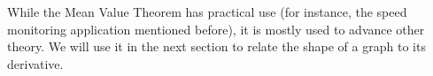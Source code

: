 While the Mean Value Theorem has practical use (for instance, the speed monitoring application mentioned before), it is mostly used to advance other theory. We will use it in the next section to relate  the shape of a graph to its derivative.\\

%

